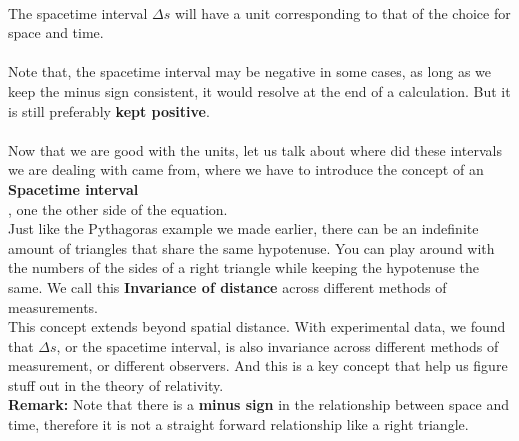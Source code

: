 \documentclass[12pt]{book}
\begin{document}
\\
The spacetime interval $\Delta s$ will have a unit corresponding to that of the choice for space and time.
\\\\
Note that, the spacetime interval may be negative in some cases, as long as we keep the minus sign consistent, it would resolve at the end of a calculation. But it is still preferably \textbf{kept positive}.\\
\\
Now that we are good with the units, let us talk about where did these intervals we are dealing with came from, where we have to introduce the concept of an \textbf{Spacetime interval}\\, one the other side of the equation.
\\
\newline
Just like the Pythagoras example we made earlier, there can be an indefinite amount of triangles that share the same hypotenuse. You can play around with the numbers of the sides of a right triangle while keeping the hypotenuse the same. We call this \textbf{Invariance of distance} across different methods of measurements. \\
\newline
This concept extends beyond spatial distance. With experimental data, we found that $\Delta s$, or the spacetime interval, is also invariance across different methods of measurement, or different observers. And this is a key concept that help us figure stuff out in the theory of relativity. \\
\newline
\textbf{Remark: }Note that there is a \textbf{minus sign} in the relationship between space and time, therefore it is not a straight forward relationship like a right triangle.
\end{document}
